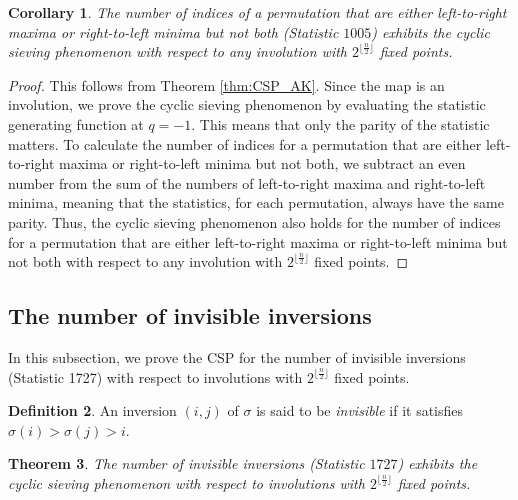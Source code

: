 \documentclass{amsart}
\newtheorem{thm}{Theorem}[section]
\newtheorem{cor}[thm]{Corollary}
\theoremstyle{definition}
\newtheorem{definition}[thm]{Definition}
\begin{document}
\begin{cor}
  \label{cor:1005}
  The number of indices of a permutation that are either left-to-right maxima or right-to-left minima but not both (Statistic $1005$) exhibits the cyclic sieving phenomenon with respect to any involution with $2^{\lfloor\frac{n}{2}\rfloor}$ fixed points.
\end{cor}

\begin{proof}
  This follows from Theorem \ref{thm:CSP_AK}. Since the map is an involution, we prove the cyclic sieving phenomenon by evaluating the statistic generating function at $q=-1$. This means that only the parity of the statistic matters. To calculate the number of indices for a permutation that are either left-to-right maxima or right-to-left minima but not both, we subtract an even number from the sum of the numbers of left-to-right maxima and right-to-left minima, meaning that the statistics, for each permutation, always have the same parity. Thus, the cyclic sieving phenomenon also holds for the number of indices for a permutation that are either left-to-right maxima or right-to-left minima but not both with respect to any involution with $2^{\lfloor\frac{n}{2}\rfloor}$ fixed points.
\end{proof}



\subsection{The number of invisible inversions} 
\label{subsec:ak_inv}
In this subsection, we prove the CSP for the number of invisible inversions (Statistic 1727)  with respect to involutions with $2^{\lfloor\frac{n}{2}\rfloor}$ fixed points.

\begin{definition}
  An inversion $(i,j)$ of $\sigma$ is said to be \emph{invisible} if it satisfies $\sigma(i)>\sigma(j)>i$.
\end{definition}

\begin{thm}\label{thm:CSP_AK-Invisible}
  The number of invisible inversions (Statistic $1727$) exhibits the cyclic sieving phenomenon with respect to involutions with $2^{\lfloor\frac{n}{2}\rfloor}$ fixed points.
\end{thm}
\end{document}
